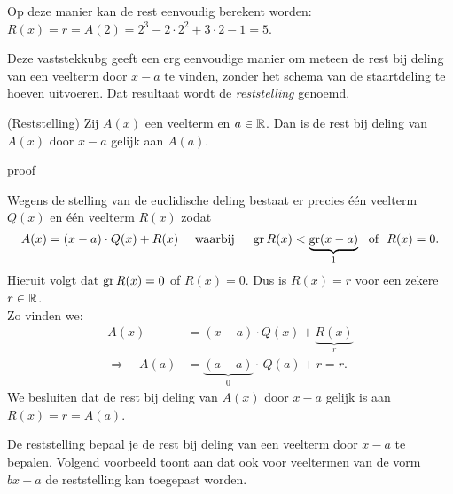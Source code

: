 \documentclass{ximera}
\begin{document}
Op deze manier kan de rest eenvoudig berekent worden: $R(x) = r = A(2) = 2^3 - 2 \cdot 2^2 + 3 \cdot 2 - 1 = 5$.



Deze vaststekkubg geeft een erg eenvoudige manier om meteen de rest bij deling van een veelterm door $x-a$ te vinden, zonder het schema van de staartdeling te hoeven uitvoeren. Dat resultaat wordt de \textit{ reststelling} genoemd.

\begin{theorem} (Reststelling)
Zij $A(x)$ een veelterm en $a \in \mathbb{R}$. Dan is de rest bij deling van $A(x)$ door $x-a$ gelijk aan $A(a)$.
\end{theorem} 


\begin{expandable}{proof}

Wegens de stelling van de euclidische deling bestaat er precies  één veelterm $Q(x)$ en één veelterm $R(x)$ zodat
\[
A(x) = (x-a)\cdot Q(x) + R(x) \quad \text{ waarbij } \quad \operatorname{gr} R(x) < \underbrace{\operatorname{gr} (x-a)}_{1} \,\, \text{ of } \,\, R(x) = 0.
\]
Hieruit volgt dat $\operatorname{gr} R(x) = 0$ of $R(x) = 0$. Dus is $R(x) = r$ voor een zekere $r \in \mathbb{R}$. \\
Zo vinden we:
\begin{align*}
A(x) & = (x-a) \cdot Q(x) + \underbrace{R(x)}_{r} \\
\Rightarrow \quad A(a) & = \underbrace{(a-a)}_{0} \cdot \, Q(a) + r = r. 
\end{align*}
We besluiten dat de rest bij deling van $A(x)$ door $x-a$ gelijk is aan $R(x) = r = A(a)$. 

\end{expandable}


De reststelling bepaal je de rest bij deling van een veelterm door $x-a$ te bepalen. Volgend voorbeeld toont aan dat ook voor veeltermen van de vorm $bx-a$ de reststelling kan toegepast worden. 
\end{document}
